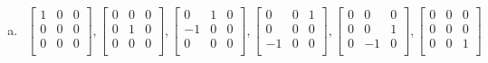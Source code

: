 \documentclass[cs4size,a4paper]{ctexart}
\numberwithin{equation}{section}
\numberwithin{table}{section}
\numberwithin{figure}{section}
\begin{document}
\begin{enumerate}[a)]
		\item 
		\begin{align}
			\left[\begin{matrix}
				1& 0&0\\
				0& 0&0\\
				0& 0&0\\
			\end{matrix}\right]
			,
			\left[\begin{matrix}
				0& 0&0\\
				0& 1&0\\
				0& 0&0\\
			\end{matrix}\right]
			,
			\left[\begin{matrix}
				0& 1&0\\
				-1& 0&0\\
				0& 0&0\\
			\end{matrix}\right]
			,
			\left[\begin{matrix}
				0& 0&1\\
				0& 0&0\\
				-1& 0&0\\
			\end{matrix}\right]
			,			
			\left[\begin{matrix}
				0& 0&0\\
				0& 0&1\\
				0& -1&0\\
			\end{matrix}\right]
			,
			\left[\begin{matrix}
				0& 0&0\\
				0& 0&0\\
				0& 0&1\\
		\end{matrix}\right]
		\end{align}
	\end{enumerate}
\end{document}
